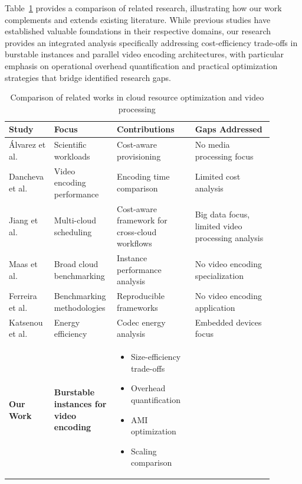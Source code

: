 \documentclass[conference]{IEEEtran}
\begin{document}
	Table~\ref{tab:comparative_analysis} provides a comparison of related research, illustrating how our work complements and extends existing literature. While previous studies have established valuable foundations in their respective domains, our research provides an integrated analysis specifically addressing cost-efficiency trade-offs in burstable instances and parallel video encoding architectures, with particular emphasis on operational overhead quantification and practical optimization strategies that bridge identified research gaps.
	
	\begin{table}[!htbp]
		\centering
		\caption{Comparison of related works in cloud resource optimization and video processing}
		\label{tab:comparative_analysis}
		\begin{tabular}{|p{0.15\linewidth}|p{0.18\linewidth}|p{0.28\linewidth}|p{0.28\linewidth}|}
			\hline
			\textbf{Study} & \textbf{Focus} & \textbf{Contributions} & \textbf{Gaps Addressed} \\
			\hline
			Álvarez et al. \cite{b2} & Scientific workloads & Cost-aware provisioning & No media processing focus \\
			\hline
			Dancheva et al. \cite{b3} & Video encoding performance & Encoding time comparison & Limited cost analysis \\
			\hline
			Jiang et al. \cite{b20} & Multi-cloud scheduling & Cost-aware framework for cross-cloud workflows & Big data focus, limited video processing analysis \\
			\hline
			Maas et al. \cite{b1} & Broad cloud benchmarking & Instance performance analysis & No video encoding specialization \\
			\hline
			Ferreira et al. \cite{b9} & Benchmarking methodologies & Reproducible frameworks & No video encoding application \\
			\hline
			Katsenou et al. \cite{b8} & Energy efficiency & Codec energy analysis & Embedded devices focus \\
			\hline
			\textbf{Our Work} & \textbf{Burstable instances for video encoding} & 
			\scriptsize
			\begin{itemize}
				\vspace{-0.2cm}
				\item Size-efficiency trade-offs
				\item Overhead quantification  
				\item AMI optimization
				\item Scaling comparison
				\vspace{-0.2cm}

\end{itemize}
\end{tabular}
\end{table}
\end{document}
